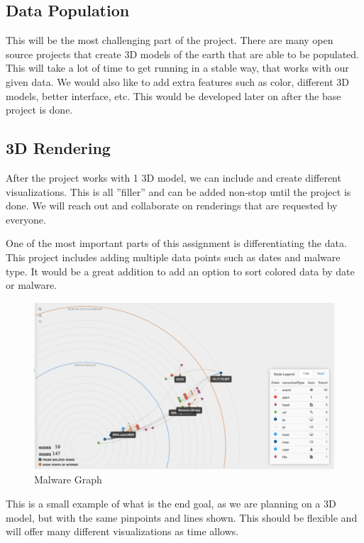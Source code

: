 \documentclass[journal,10pt,onecolumn,compsoc]{IEEEtran} \usepackage[margin=1.0in]{geometry} \usepackage{pdfpages}
\begin{document}
    \subsection{Data Population}
    This will be the most challenging part of the project. There are many open source projects that create 3D models of the earth that are able to be populated. This will take a lot of time to get running in a stable way, that works with our given data. We would also like to add extra features such as color, different 3D models, better interface, etc. This would be developed later on after the base project is done.

    \subsection{3D Rendering}
    After the project works with 1 3D model, we can include and create different visualizations. This is all ”filler” and can be added non-stop until the project is done. We will reach out and collaborate on renderings that are requested by everyone.
    
    \noindent \newline One of the most important parts of this assignment is differentiating the data. This project includes adding multiple data points such as dates and malware type. It would be a great addition to add an option to sort colored data by date or malware.
     
     \begin{figure}[H]
         \centering
         \includegraphics[width=\linewidth]{./Graph1.png}
         \caption{ Malware Graph}
     \end{figure}
    \noindent This is a small example\cite{MalwareGraph} of what is the end goal, as we are planning on a 3D model, but with the same pinpoints and lines shown. This should be flexible and will offer many different visualizations as time allows.
    
\end{document}
